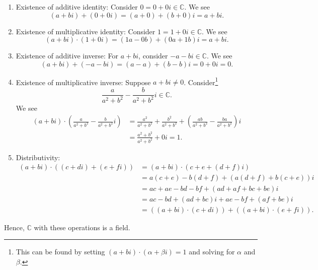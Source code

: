 \begin{sltn}[\ref{exer:cfield}]
\begin{enumerate}
    \item Existence of additive identity: Consider $ 0=0+0i\in\mathbb{C} $. We see
    \begin{equation*}
        (a+bi)+(0+0i)=(a+0)+(b+0)i=a+bi.
    \end{equation*}

    \item Existence of multiplicative identity: Consider $ 1=1+0i\in\mathbb{C} $. We see
    \begin{equation*}
        (a+bi)\cdot(1+0i)=(1a-0b)+(0a+1b)i=a+bi.
    \end{equation*}

    \item Existence of additive inverse: For $ a+bi $, consider $ -a-bi\in\mathbb{C} $. We see
    \begin{equation*}
        (a+bi)+(-a-bi)=(a-a)+(b-b)i=0+0i=0.
    \end{equation*}

    \item Existence of multiplicative inverse: Suppose $ a+bi\neq 0 $. Consider\footnote{This can be found by setting $ (a+bi)\cdot(\alpha+\beta i)=1 $ and solving for $ \alpha $ and $ \beta $.}
    \begin{equation*}
        \frac{a}{a^2+b^2}-\frac{b}{a^2+b^2}i\in\mathbb{C}.
    \end{equation*}
    We see
    \begin{align*}
        (a+bi)\cdot\left(\frac{a}{a^2+b^2}-\frac{b}{a^2+b^2}i\right) &= \frac{a^2}{a^2+b^2}+\frac{b^2}{a^2+b^2}+\left(\frac{ab}{a^2+b^2}-\frac{ba}{a^2+b^2}\right)i \\
        &= \frac{a^2+b^2}{a^2+b^2}+0i=1.
    \end{align*}

    \item Distributivity:
    \begin{align*}
        (a+bi)\cdot((c+di)+(e+fi)) &= (a+bi)\cdot(c+e+(d+f)i) \\
        &= a(c+e)-b(d+f)+(a(d+f)+b(c+e))i \\
        &= ac+ae-bd-bf+(ad+af+bc+be)i \\
        &= ac-bd+(ad+bc)i+ae-bf+(af+be)i \\
        &= ((a+bi)\cdot(c+di))+((a+bi)\cdot(e+fi)).
    \end{align*}
\end{enumerate}
Hence, $ \mathbb{C} $ with these operations is a field.
\end{sltn}
